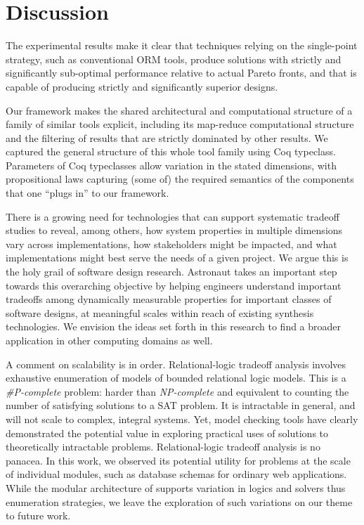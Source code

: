 \documentclass[10pt,conference]{IEEEtran}
\begin{document}
 
 
\section{Discussion}
\label{discussion}

The experimental results make it clear that techniques relying on the single-point strategy, such as conventional ORM tools, produce solutions with strictly and significantly sub-optimal performance relative to actual Pareto fronts, and that \@approach  is capable of producing strictly and significantly superior designs.

Our framework makes the shared architectural and computational structure of a family of similar tools explicit, including its map-reduce computational structure and the filtering of results that are strictly dominated by other results. We captured the general structure of this whole tool family using Coq typeclass. Parameters of Coq typeclasses allow variation in the stated dimensions, with propositional laws capturing (some of) the required semantics of the components that one ``plugs in'' to our framework.

There is a growing need for technologies that can support systematic tradeoff studies to reveal, among others, how system properties in multiple dimensions vary across implementations, how stakeholders might be impacted, and what implementations might best serve the needs of a given project. We argue this is the holy grail of software design research. Astronaut takes an important step towards this overarching objective by helping engineers understand important tradeoffs among dynamically measurable properties for important classes of software designs, at meaningful scales within reach of existing synthesis technologies. We envision the ideas set forth in this research to find a broader application in other computing domains as well.


A comment on scalability is in order. Relational-logic tradeoff analysis involves exhaustive enumeration of models of bounded relational logic models. This is a {\em \#P-complete} problem: harder than {\em NP-complete} and equivalent to counting the number of satisfying solutions to a SAT problem. It is intractable in general, and will not scale to complex, integral systems. Yet, model checking tools have clearly demonstrated the potential value in exploring practical uses of solutions to theoretically intractable problems. Relational-logic tradeoff analysis is no panacea.  In this work, we observed its potential utility for problems at the scale of individual modules, such as database schemas for ordinary web applications. While the modular architecture of \@approach supports variation in logics and solvers thus enumeration strategies, we leave the exploration of such variations on our theme to future work. 
\end{document}
